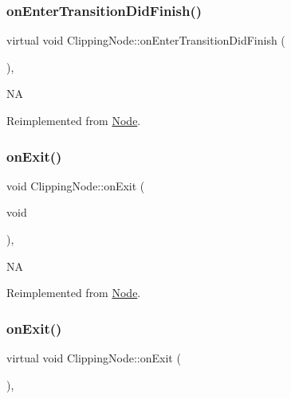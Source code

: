 \subsubsection{\texorpdfstring{on\+Enter\+Transition\+Did\+Finish()}{onEnterTransitionDidFinish()}\hspace{0.1cm}{\footnotesize\ttfamily [2/2]}}
{\footnotesize\ttfamily virtual void Clipping\+Node\+::on\+Enter\+Transition\+Did\+Finish (\begin{DoxyParamCaption}{ }\end{DoxyParamCaption})\hspace{0.3cm}{\ttfamily [override]}, {\ttfamily [virtual]}}

NA 

Reimplemented from \hyperlink{classNode_afef4b2a863042a9ea456e952cf26991d}{Node}.

\mbox{\label{classClippingNode_abbe7e15178005613c97b8c88dea6ce6c}} 
\subsubsection{\texorpdfstring{on\+Exit()}{onExit()}\hspace{0.1cm}{\footnotesize\ttfamily [1/2]}}
{\footnotesize\ttfamily void Clipping\+Node\+::on\+Exit (\begin{DoxyParamCaption}\item[{void}]{ }\end{DoxyParamCaption})\hspace{0.3cm}{\ttfamily [override]}, {\ttfamily [virtual]}}

NA 

Reimplemented from \hyperlink{classNode_ac83de835ea315e3179d4293acd8903ac}{Node}.

\mbox{\label{classClippingNode_a7766b27739f9f11792908d6ca790bd92}} 
\subsubsection{\texorpdfstring{on\+Exit()}{onExit()}\hspace{0.1cm}{\footnotesize\ttfamily [2/2]}}
{\footnotesize\ttfamily virtual void Clipping\+Node\+::on\+Exit (\begin{DoxyParamCaption}{ }\end{DoxyParamCaption})\hspace{0.3cm}{\ttfamily [override]}, {\ttfamily [virtual]}}

